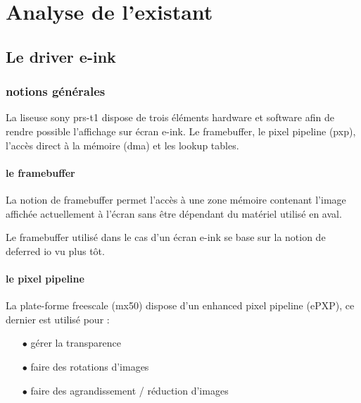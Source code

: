 \chapter{Analyse de l'existant}


\section{Le driver e-ink}

\subsection{notions générales}
La liseuse sony prs-t1 dispose de trois éléments hardware et software afin 
de rendre possible l'affichage sur écran e-ink. Le framebuffer, le pixel pipeline (pxp), l'accès direct à la mémoire (dma) et les lookup tables.

\subsubsection{le framebuffer}

La notion de framebuffer permet l'accès à une zone mémoire contenant l'image affichée actuellement à l'écran sans être dépendant  du matériel utilisé en aval.

Le framebuffer utilisé dans le cas d'un écran e-ink se base sur la notion de deferred io vu plus tôt.

\subsubsection{le pixel pipeline}

La plate-forme freescale (mx50) dispose d'un enhanced pixel pipeline (ePXP), ce dernier est utilisé pour : 
	\begin{itemize}
		\item[$\bullet$] gérer la transparence
		\item[$\bullet$] faire des rotations d'images
		\item[$\bullet$] faire des agrandissement / réduction d'images\\
	\end{itemize}

